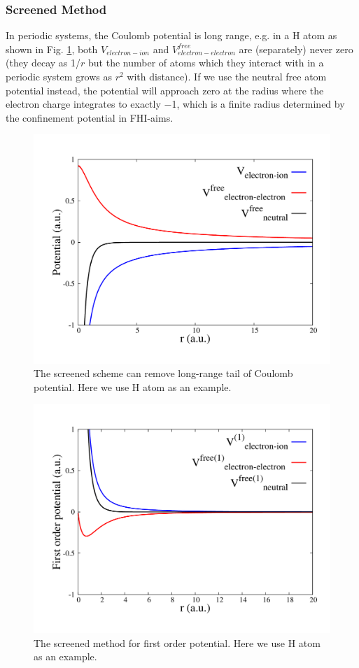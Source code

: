 {\subsubsection{Screened Method}
In periodic systems, the Coulomb potential is long range, e.g. in a H atom as shown in Fig. \ref{fig:combied }, both $V_{electron-ion}$
and $V^{free}_{electron-electron}$ are (separately) never zero (they decay as 1/$r$ but the number of atoms which they interact with in a periodic system
grows as $r^2$ with distance). 
If we use the neutral free atom potential instead, the 
potential will approach zero at the radius where the electron charge integrates to exactly $-$1,
which is a finite radius determined by the confinement potential in FHI-aims.
\begin{figure}
 \includegraphics[width=0.7\columnwidth]{why_v_free}
 \caption{The screened scheme can remove long-range tail of Coulomb potential. Here we use H atom as an example.}
 \label{fig:combied }
\end{figure}
\begin{figure}
 \includegraphics[width=0.7\columnwidth]{why_v_free_1}
 \caption{The screened method for first order potential. Here we use H atom as an example.}
\end{figure}

}
